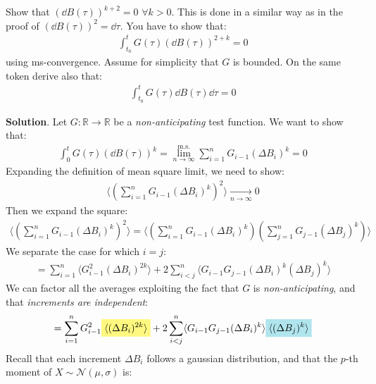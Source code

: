 \documentclass[../template.tex]{subfiles}
\begin{document}
\begin{exo}
    Show that $(\dd{B(\tau)})^{k+2} = 0$ $\forall k > 0$. This is done in a similar way as in the proof of $(\dd{B(\tau)})^2 = \dd{\tau}$. You have to show that:
    \begin{align*}
        \int_{t_0}^t G(\tau) (\dd{B(\tau)})^{2+k} = 0
    \end{align*}
    using ms-convergence. Assume for simplicity that $G$ is bounded. On the same token derive also that:
    \begin{align*}
        \int_{t_0}^t G(\tau) \dd{B(\tau)}\dd{\tau} = 0
    \end{align*}

    \medskip

    \textbf{Solution}. Let $G \colon \mathbb{R} \to \mathbb{R}$ be a \textit{non-anticipating} test function. We want to show that:
    \begin{align*}
        \int_0^t G(\tau) (\dd{B(\tau)})^k = \overset{\mathrm{m.s.} }{\lim_{n \to \infty}} \sum_{i=1}^n G_{i-1} (\Delta B_i)^k = 0
    \end{align*} 
    Expanding the definition of mean square limit, we need to show:
    \begin{align*}
        \langle \left(\sum_{i=1}^n G_{i-1} (\Delta B_i)^k\right)^2 \rangle  \xrightarrow[n \to \infty]{}  0
    \end{align*}
    Then we expand the square:
    \begin{align*}
        \langle \left(\sum_{i=1}^n G_{i-1} (\Delta B_i)^k\right)^2 \rangle = \langle \left(\sum_{i=1}^n G_{i-1} (\Delta B_i)^k\right) \left(\sum_{j=1}^n G_{j-1} (\Delta B_j)^k\right) \rangle
    \end{align*}
    We separate the case for which $i=j$:
    \begin{align*}
        = \sum_{i=1}^n \langle G_{i-1}^2 (\Delta B_i)^{2k} \rangle + 2 \sum_{i<j}^n \langle G_{i-1} G_{j-1} (\Delta B_i)^k (\Delta B_j)^k \rangle
    \end{align*} 
    We can factor all the averages exploiting the fact that $G$ is \textit{non-anticipating}, and that \textit{increments are independent}:
    \begin{align} \label{eqn:last}
        = \sum_{i=1}^n G_{i-1}^2 \hlc{Yellow}{\langle (\Delta B_i)^{2k} \rangle }+ 2 \sum_{i< j}^n \langle G_{i-1} G_{j-1} (\Delta B_i)^k \rangle\hlc{SkyBlue}{ \langle (\Delta B_j)^k \rangle}
    \end{align}  
    Recall that each increment $\Delta B_i$ follows a gaussian distribution, and that the $p$-th moment of $X \sim \mathcal{N}(\mu,\sigma)$ is:

\end{exo}
\end{document}
